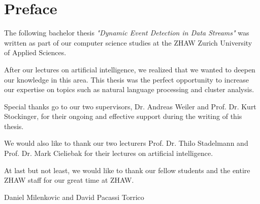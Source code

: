 
\section{Preface}

The following bachelor thesis \textit{"Dynamic Event Detection in Data Streams"} was written
as part of our computer science studies at the ZHAW Zurich University of Applied Sciences.

After our lectures on artificial intelligence, we realized that we wanted to deepen our knowledge in this area.
This thesis was the perfect opportunity to increase our expertise on topics such as natural language processing
and cluster analysis.

Special thanks go to our two supervisors, Dr. Andreas Weiler and Prof. Dr. Kurt Stockinger,
for their ongoing and effective support during the writing of this thesis.

We would also like to thank our two lecturers Prof. Dr. Thilo Stadelmann
and Prof. Dr. Mark Cieliebak for their lectures on artificial intelligence.

At last but not least, we would like to thank our fellow students
and the entire ZHAW staff for our great time at ZHAW.

Daniel Milenkovic and David Pacassi Torrico

